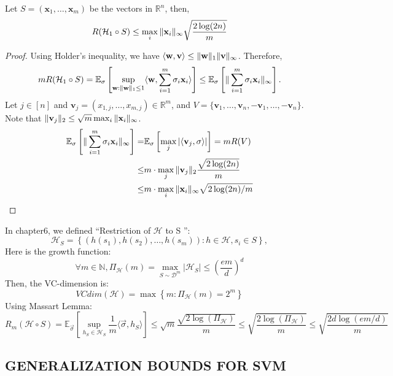 \begin{lemma}
    Let $ S = ( \mathbf{x}_1, \ldots, \mathbf{x}_m ) $ be the vectors in $ \mathbb{R}^n $, then,
    \begin{equation}
        R( \mathcal{H}_1 \circ S) \le \max_i \Arrowvert \mathbf{x}_i \Arrowvert_\infty
        \sqrt{\frac{2\log(2n)}{m}}
    \end{equation}
    \begin{proof}
        Using Holder's inequality, we have $ \langle \mathbf{w}, \mathbf{v} \rangle \le \Arrowvert \mathbf{w} \Arrowvert_1 \Arrowvert \mathbf{v} \Arrowvert_\infty$. Therefore,
        \begin{align*}
            mR( \mathcal{H}_1 \circ S )
            = \mathbb{E}_\sigma \left[ \sup_{\mathbf{w}:\Arrowvert \mathbf{w} \Arrowvert_1 \le 1} \langle \mathbf{w}, \sum^{m}_{i=1} \sigma_i \mathbf{x}_i \rangle \right]
            \le \mathbb{E}_\sigma \left[ \Arrowvert \sum^{m}_{i=1} \sigma_i \mathbf{x}_i \Arrowvert_\infty \right].
        \end{align*}
        Let $ j \in [n] $ and $ \mathbf{v}_j = ( x_{1,j}, \ldots, x_{m,j}) \in \mathbb{R}^m $,
        and $ V = \{ \mathbf{v}_1, \ldots, \mathbf{v}_n, - \mathbf{v}_1, \ldots, - \mathbf{v}_n \} $.
        Note that $ \Arrowvert \mathbf{v}_j \Arrowvert_2 \le \sqrt{m} \max_i \Arrowvert \mathbf{x}_i \Arrowvert_\infty $.
        \begin{align*}
            \mathbb{E}_\sigma \left[ \Arrowvert \sum^{m}_{i=1} \sigma_i \mathbf{x}_i \Arrowvert_\infty \right]
            =& \mathbb{E}_\sigma \left[ \max_j | \langle \mathbf{v}_j, \sigma \rangle | \right]
            = m R(V) \\
            \le& m \cdot \max_j \Arrowvert \mathbf{v}_j \Arrowvert_2 \frac{\sqrt{2\log(2n)}}{m} \\
            \le& m \cdot \max_i \Arrowvert \mathbf{x}_i \Arrowvert_\infty \sqrt{2\log(2n)/m}
        \end{align*}
    \end{proof}
\end{lemma}

In chapter6, we defined ``Restriction of $ \mathcal{H} $ to S '':
\[
    \mathcal{H}_S = \left\{ (h(s_1), h(s_2), \ldots, h(s_m)) : h \in \mathcal{H}, s_i \in S\right\},
\]
Here is the growth function:
\[
\forall m \in \mathbb{N}, \Pi_{ \mathcal{H}} (m) = \max_{S \sim \mathcal{D}^m} \left| \mathcal{H}_S \right| \le {\left( \frac{em}{d}  \right)}^d
\]
Then, the VC-dimension is:
\[
    VCdim( \mathcal{H}) = \max \left\{ m: \Pi_ \mathcal{H}(m) = 2^m \right\}
\]
Using Massart Lemma:
\[
    R_m(\mathcal{H} \circ S) = \mathbb{E}_{\vec{\sigma} } \left[ \sup_{h_S \in \mathcal{H}_S} \frac{1}{m} \langle \vec{\sigma}, h_S \rangle \right] \le \sqrt{m} \frac{\sqrt{2 \log (\Pi_{\mathcal{H}})}}{m} \le \sqrt{ \frac{2\log(\Pi_{\mathcal{H}})}{m} } \le \sqrt{ \frac{2d \log (em/d)}{m} }
\]

\subsection{GENERALIZATION BOUNDS FOR SVM}%
\label{sub:generalization_bounds_for_svm}


